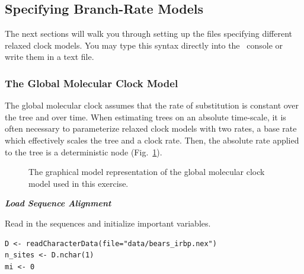 \bigskip
\subsection{Specifying Branch-Rate Models}\label{brMods} 

The next sections will walk you through setting up the files specifying different relaxed clock models. 
You may type this syntax directly into the \RevBayes~console or write them in a text file.

\bigskip
\subsubsection{The Global Molecular Clock Model}

The global molecular clock assumes that the rate of substitution is constant over the tree and over time.
When estimating trees on an absolute time-scale, it is often necessary to parameterize relaxed clock models with two rates, a base rate which effectively scales the tree and a clock rate. 
Then, the absolute rate applied to the tree is a deterministic node (Fig.~\ref{m_GMC:fig}).

\begin{figure}[h!]
\centering
{}
\caption{\small The graphical model representation of the global molecular clock model used in this exercise.}
\label{m_GMC:fig}
\end{figure}


\textbf{\textit{Load Sequence Alignment}}

Read in the sequences and initialize important variables.
{\tt \begin{snugshade*}
\begin{lstlisting}
D <- readCharacterData(file="data/bears_irbp.nex")
n_sites <- D.nchar(1)
mi <- 0
\end{lstlisting}
\end{snugshade*}}

